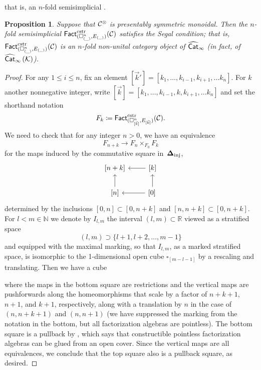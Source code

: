 \documentclass[10pt, reqno, twoside
, final
]{amsart}
\numberwithin{equation}{subsection}%
\theoremstyle{definition}
\theoremstyle{definition}
\theoremstyle{definition}
\theoremstyle{definition}
\theoremstyle{definition}
\theoremstyle{definition}
\theoremstyle{definition}
\theoremstyle{definition}
\theoremstyle{definition}
\theoremstyle{plain}
\theoremstyle{definition}
\theoremstyle{plain}
\theoremstyle{definition}
\theoremstyle{plain}
\theoremstyle{definition}
\theoremstyle{definition}
\theoremstyle{plain}
\theoremstyle{plain}
\theoremstyle{definition}
\theoremstyle{plain}
\theoremstyle{plain}
\newtheorem{prop}[defn]{Proposition}
\theoremstyle{plain}
\begin{document}
that is, an $n$-fold semisimplicial \infcatt.
\begin{prop}\label{prop:moritasegal}
Suppose that $\mathcal{C}^{\otimes}$ is presentably symmetric monoidal.
Then the $n$-fold semisimplicial \infcat $\mathsf{Fact}^{\mathrm{cstr}}_{(\square^n_{(\_)},E_{(\_)}) }(\mathcal{C})$ satisfies the Segal condition; that is, $\mathsf{Fact}^{\mathrm{cstr}}_{(\square^n_{(\_)},E_{(\_)}) }(\mathcal{C})$ is an $n$-fold non-unital category object of $\widehat{\mathsf{Cat}}_{\infty}$ (in fact, of $\widehat{\mathsf{Cat}}_{\infty}\left(\mathcal{K}\right)$).
\end{prop}
\begin{proof}
For any $1\leq i\leq n$, fix an element $[\vec{k}']=[k_1,\ldots, k_{i-1}, k_{i+1},\ldots k_n]$. For $k$ another nonnegative integer, write $[\vec{k}]=[k_1,\ldots, k_{i-1},k, k_{i+1},\ldots k_n]$ and set the shorthand notation
\begin{equation}\label{eqn:short_Fact}
F_k\coloneqq \mathsf{Fact}^{\mathrm{cstr}}_{(\square^n_{[\vec{k}]},E_{[\vec{k}]})}(\mathcal{C}).
\end{equation}
We need to check that for any integer $n>0$, we have an equivalence
\[F_{n+k}\longrightarrow F_n\times_{F_0}  F_k\]
for the maps induced by the commutative square in~$\boldsymbol{\Delta}_{\mathrm{inj}}$,
\[\begin{tikzcd}
{[n+k]} & {[k]} \arrow{l} \\
{[n]} \arrow{u} & {[0]}  \arrow{u} \arrow{l}\,
\end{tikzcd}\]
determined by the inclusions $[0,n]\subset [0,n+k]$ and $[n,n+k]
\subset [0,n+k]$. For $l<m\in \mathbb{N}$ we denote by $I_{l,m}$ the interval $(l, m)\subset \mathbb{R}$ viewed as a stratified space \[(l, m)\supset \{l+1,l+2,\ldots, m-1\}\]
and equipped with the maximal marking, so that $I_{l,m}$, as a marked stratified space, is isomorphic to the 1-dimensional open cube $\square_{[m-l-1]}$ by a rescaling and translating. Then we have a cube
\begin{center}
\end{center}
where the maps in the bottom square are restrictions and the vertical maps are pushforwards along the homeomorphisms that scale by a factor of $n+k+1$, $n+1$, and $k+1$, respectively, along with  a translation by $n$ in the case of $(n,n+ k+1)$ and $(n,n+1)$ (we have suppressed the marking from the notation in the bottom, but all factorization algebras are pointless). The bottom square is a pullback by 
\cite[Theorem 5.3]{KS}, which says that constructible pointless factorization algebras can be glued from an open cover. Since the vertical maps are all equivalences, we conclude that the top square also is a pullback square, as desired.
\end{proof}
\end{document}
